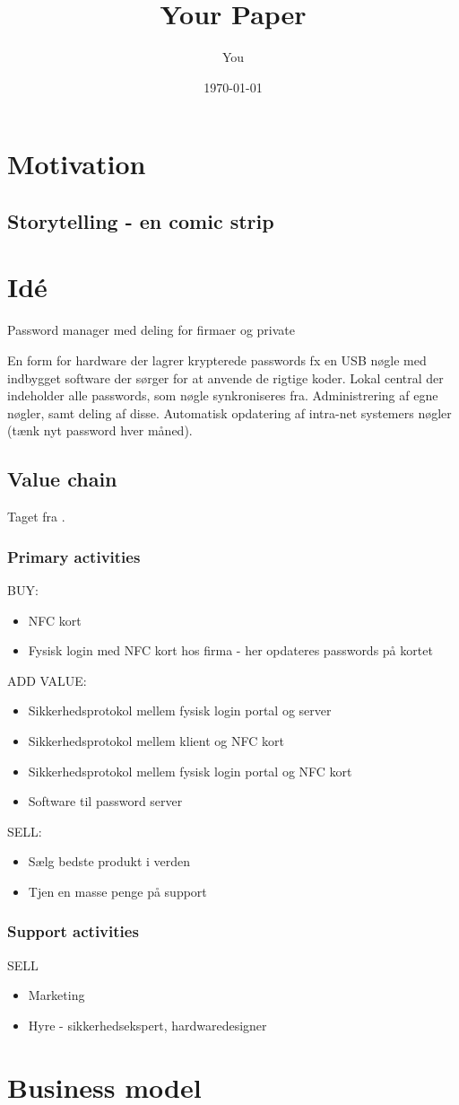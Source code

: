 \documentclass[a4paper]{article}
\title{Your Paper}
\author{You}
\date{\today}
\begin{document}
\maketitle

\section{Motivation}
\subsection{Storytelling - en comic strip}

\section{Idé}

Password manager med deling for firmaer og private

En form for hardware der lagrer krypterede passwords fx en USB nøgle med indbygget software der sørger for at anvende de rigtige koder.
Lokal central der indeholder alle passwords, som nøgle synkroniseres fra.
Administrering af egne nøgler, samt deling af disse.
Automatisk opdatering af intra-net systemers nøgler (tænk nyt password hver måned).

\subsection{Value chain}
Taget fra \cite[p.~12]{rose2012software}.
\subsubsection*{Primary activities}
BUY:
\begin{itemize}
\item NFC kort
\item Fysisk login med NFC kort hos firma - her opdateres passwords på kortet
\end{itemize}
ADD VALUE:
\begin{itemize}
\item Sikkerhedsprotokol mellem fysisk login portal og server
\item Sikkerhedsprotokol mellem klient og NFC kort
\item Sikkerhedsprotokol mellem fysisk login portal og NFC kort
\item Software til password server
\end{itemize}
SELL:
\begin{itemize}
\item Sælg bedste produkt i verden
\item Tjen en masse penge på support
\end{itemize}

\subsubsection*{Support activities}
SELL
\begin{itemize}
\item Marketing
\item Hyre - sikkerhedsekspert, hardwaredesigner
\end{itemize}

\section{Business model}
\end{document}
